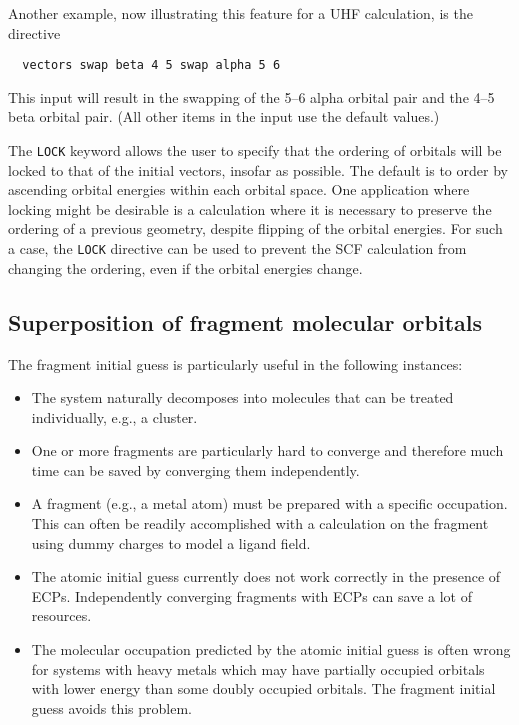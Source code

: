 Another example, now illustrating this feature for a UHF calculation,
is the directive
\begin{verbatim}
  vectors swap beta 4 5 swap alpha 5 6
\end{verbatim}
This input will result in the swapping of the 5--6 alpha orbital pair
and the 4--5 beta orbital pair.  (All other items in the input use the
default values.)

The \verb+LOCK+ keyword allows the user to specify that the ordering
of orbitals will be locked to that of the initial vectors, insofar as
possible. The default is to order by ascending orbital energies within
each orbital space. One application where locking might be desirable
is a calculation where it is necessary to preserve the ordering of a
previous geometry, despite flipping of the orbital energies.  For such
a case, the \verb+LOCK+ directive can be used to prevent the SCF
calculation from changing the ordering, even if the orbital energies
change.

\subsection{Superposition of fragment molecular orbitals}
\label{sec:fragguess}

The fragment initial guess is particularly useful in the following
instances:
\begin{itemize}
\item The system naturally decomposes into molecules that can be
  treated individually, e.g., a cluster.
\item One or more fragments are particularly hard to converge and
  therefore much time can be saved by converging them independently.
\item A fragment (e.g., a metal atom) must be prepared with a specific
  occupation.  This can often be readily accomplished with a
  calculation on the fragment using dummy charges to model a ligand
  field.
\item The atomic initial guess currently does not work correctly in
  the presence of ECPs.  Independently converging fragments with ECPs 
  can save a lot of resources.
\item The molecular occupation predicted by the atomic initial guess
  is often wrong for systems with heavy metals which may have
  partially occupied orbitals with lower energy than some doubly
  occupied orbitals.  The fragment initial guess avoids this problem.
\end{itemize}

